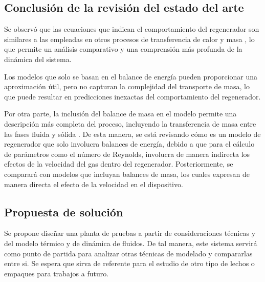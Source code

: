 \documentclass[12pt,letterpaper,final]{article}%
\begin{document}
\subsection{Conclusión de la revisión del estado del arte}

Se observó que las ecuaciones que indican el comportamiento del regenerador son similares a las empleadas en otros procesos de transferencia de calor y masa \cite{Kilkovsky2020} \cite{Kulkarni1992} \cite{SADRAMELI2016}, lo que permite un análisis comparativo y una comprensión más profunda de la dinámica del sistema.

Los modelos que solo se basan en el balance de energía pueden proporcionar una aproximación útil, pero no capturan la complejidad del transporte de masa, lo que puede resultar en predicciones inexactas del comportamiento del regenerador.

Por otra parte, la inclusión del balance de masa en el modelo permite una descripción más completa del proceso, incluyendo la transferencia de masa entre las fases fluida y sólida \cite{Ramachadran1984}. De esta manera, se está revisando cómo es un modelo de regenerador que solo involucra balances de energía, debido a que para el cálculo de parámetros como el número de Reynolds, involucra de manera indirecta los efectos de la velocidad del gas dentro del regenerador. Posteriormente, se comparará con modelos que incluyan balances de masa, los cuales expresan de manera directa el efecto de la velocidad en el dispositivo.
\newpage

\subsection{Propuesta de soluci\'on} 
Se propone dise\~nar una planta de pruebas a partir de consideraciones t\'ecnicas y del modelo t\'ermico y de din\'amica de fluidos. De tal manera, este sistema servir\'a como punto de partida para analizar otras t\'ecnicas de modelado y compararlas entre si. Se espera que sirva de referente para el estudio de otro tipo de lechos o empaques para trabajos a futuro.
\end{document}
